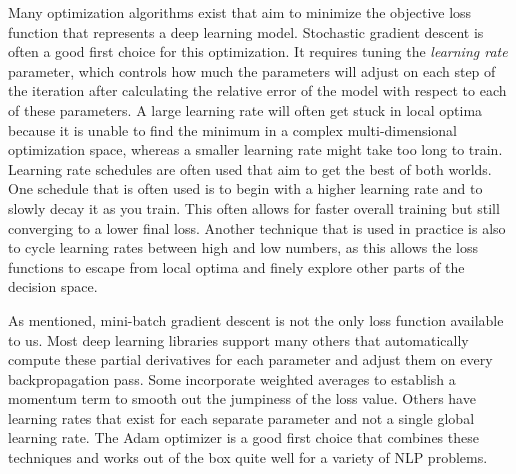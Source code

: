 Many optimization algorithms exist that aim to minimize the objective loss function that represents a deep learning model. Stochastic
gradient descent is often a good first choice for this optimization. It requires tuning the \textit{learning rate} parameter, which controls how much the parameters
will adjust on each step of the iteration after calculating the relative error of the model with respect to each of these parameters. A large learning rate
will often get stuck in local optima because it is unable to find the minimum in a complex multi-dimensional optimization space, whereas a smaller learning rate
might take too long to train. Learning rate schedules are often used that aim to get the best of both worlds. One schedule that is often used is to
begin with a higher learning rate and to slowly decay it as you train. This often allows for faster overall training but still converging to a lower final loss.
Another technique that is used in practice is also to cycle learning rates between high and low numbers, as this allows the loss functions to escape
from local optima and finely explore other parts of the decision space.

As mentioned, mini-batch gradient descent is not the only loss function available to us. Most deep learning libraries support many others that
automatically compute these partial derivatives for each parameter and adjust them on every backpropagation pass. Some incorporate weighted averages to establish
a momentum term to smooth out the jumpiness of the loss value. Others have learning rates that exist for each separate parameter and not a single global learning rate.
The Adam optimizer is a good first choice that combines these techniques and works out of the box quite well for a variety of NLP problems.


